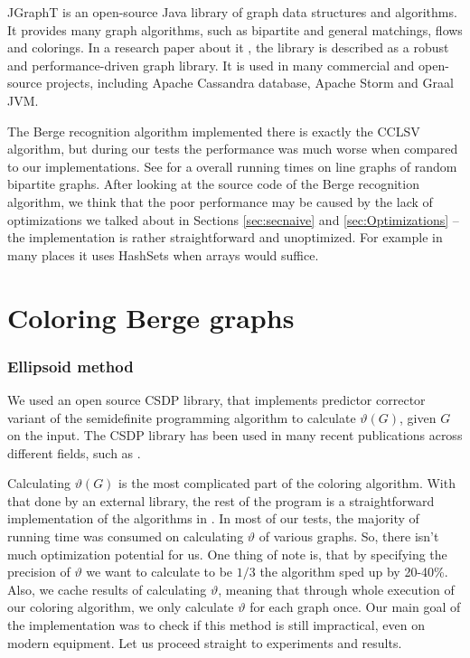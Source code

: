 JGraphT \cite{jgrapht} is an open-source Java library of graph data structures and algorithms. It provides many graph algorithms, such as bipartite and general matchings, flows and colorings. In a research paper about it \cite{jgraphtPaper}, the library is described as a robust and performance-driven graph library. It is used in many commercial and open-source projects, including Apache Cassandra database, Apache Storm and Graal JVM.

The Berge recognition algorithm implemented there is exactly the CCLSV algorithm, but during our tests the performance was much worse when compared to our implementations. See  for a overall running times on line graphs of random bipartite graphs. After looking at the source code of the Berge recognition algorithm, we think that the poor performance may be caused by the lack of optimizations we talked about in Sections \ref{sec:secnaive} and \ref{sec:Optimizations} -- the implementation is rather straightforward and unoptimized. For example in many places it uses HashSets when arrays would suffice.

\section{Coloring Berge graphs}

\subsubsection{Ellipsoid method}

We used an open source CSDP \cite{csdpRepo, csdp1999} library, that implements predictor corrector variant of the semidefinite programming algorithm to calculate $\vartheta(G)$, given $G$ on the input. The CSDP library has been used in many recent publications across different fields, such as \cite{Ampountolas_2017, Adasme_2011}.

Calculating $\vartheta(G)$ is the most complicated part of the coloring algorithm. With that done by an external library, the rest of the program is a straightforward implementation of the algorithms in . In most of our tests, the majority of running time was consumed on calculating $\vartheta$ of various graphs. So, there isn't much optimization potential for us. One thing of note is, that by specifying the precision of $\vartheta$ we want to calculate to be $1/3$ the algorithm sped up  by 20-40\%. Also, we cache results of calculating $\vartheta$, meaning that through whole execution of our coloring algorithm, we only calculate $\vartheta$ for each graph once. Our main goal of the implementation was to check if this method is still impractical, even on modern equipment. Let us proceed straight to experiments and results.

